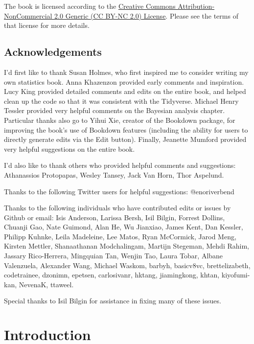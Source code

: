 \documentclass[12pt,]{book}
\theoremstyle{definition}
\theoremstyle{definition}
\theoremstyle{definition}
\theoremstyle{remark}
\begin{document}
The book is licensed according to the \href{https://creativecommons.org/licenses/by-nc/2.0/}{Creative Commons Attribution-NonCommercial 2.0 Generic (CC BY-NC 2.0) License}. Please see the terms of that license for more details.

\hypertarget{acknowledgements}{%
\section{Acknowledgements}\label{acknowledgements}}

I'd first like to thank Susan Holmes, who first inspired me to consider writing my own statistics book. Anna Khazenzon provided early comments and inspiration. Lucy King provided detailed comments and edits on the entire book, and helped clean up the code so that it was consistent with the Tidyverse. Michael Henry Tessler provided very helpful comments on the Bayesian analysis chapter. Particular thanks also go to Yihui Xie, creator of the Bookdown package, for improving the book's use of Bookdown features (including the ability for users to directly generate edits via the Edit button). Finally, Jeanette Mumford provided very helpful suggestions on the entire book.

I'd also like to thank others who provided helpful comments and suggestions: Athanassios Protopapas, Wesley Tansey, Jack Van Horn, Thor Aspelund.

Thanks to the following Twitter users for helpful suggestions: @enoriverbend

Thanks to the following individuals who have contributed edits or issues by Github or email:
Isis Anderson, Larissa Bersh, Isil Bilgin, Forrest Dollins, Chuanji Gao, Nate Guimond, Alan He, Wu Jianxiao, James Kent, Dan Kessler, Philipp Kuhnke, Leila Madeleine, Lee Matos, Ryan McCormick, Jarod Meng, Kirsten Mettler, Shanaathanan Modchalingam, Martijn Stegeman, Mehdi Rahim, Jassary Rico-Herrera, Mingquian Tan, Wenjin Tao, Laura Tobar, Albane Valenzuela, Alexander Wang, Michael Waskom,
barbyh, basicv8vc, brettelizabeth, codetrainee, dzonimn, epetsen, carlosivanr, hktang, jiamingkong, khtan, kiyofumi-kan, NevenaK, ttaweel.

Special thanks to Isil Bilgin for assistance in fixing many of these issues.

\hypertarget{introduction}{%
\chapter{Introduction}\label{introduction}}
\end{document}
